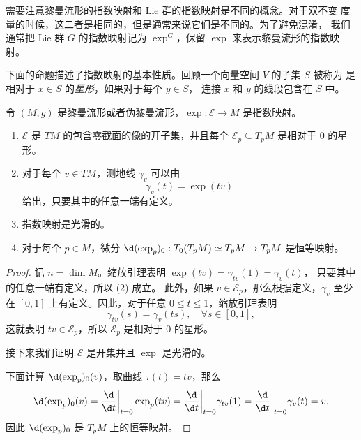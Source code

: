 需要注意黎曼流形的指数映射和 Lie 群的指数映射是不同的概念。对于双不变
度量的时候，这二者是相同的，但是通常来说它们是不同的。为了避免混淆，
我们通常把 Lie 群 $G$ 的指数映射记为 $\exp^G$，保留 $\exp$ 来表示黎曼流形的指数映射。

下面的命题描述了指数映射的基本性质。回顾一个向量空间 $V$ 的子集 $S$ 被称为
是相对于 $x\in S$ 的\emph{星形}，如果对于每个 $y\in S$，
连接 $x$ 和 $y$ 的线段包含在 $S$ 中。

\begin{proposition}[指数映射的性质]
  令 $(M,g)$ 是黎曼流形或者伪黎曼流形，$\exp:\mathcal{E}\to M$ 是指数映射。
  \begin{enumerate}
    \item $\mathcal{E}$ 是 $TM$ 的包含零截面的像的开子集，并且每个 $\mathcal{E}_p\subseteq T_pM$
    是相对于 $0$ 的星形。
    \item 对于每个 $v\in TM$，测地线 $\gamma_v$ 可以由
    \begin{equation}
      \gamma_v(t)=\exp(tv)
    \end{equation}
    给出，只要其中的任意一端有定义。
    \item 指数映射是光滑的。
    \item 对于每个 $p\in M$，微分 $\d(\exp_p)_0:T_0(T_pM)\simeq T_pM\to T_pM$
    是恒等映射。
  \end{enumerate}
\end{proposition}
\begin{proof}
  记 $n=\dim M$。缩放引理表明 $\exp(tv)=\gamma_{tv}(1)=\gamma_v(t)$，
  只要其中的任意一端有定义，所以 (2) 成立。
  此外，如果 $v\in \mathcal{E}_p$，那么根据定义，$\gamma_v$ 至少在 $[0,1]$
  上有定义。因此，对于任意 $0\leq t\leq 1$，缩放引理表明
  \[
    \gamma_{tv}(s)=\gamma_v(ts),\quad \forall s\in [0,1],
  \]
  这就表明 $tv\in \mathcal{E}_p$，所以 $\mathcal{E}_p$ 是相对于 $0$ 的星形。

  接下来我们证明 $\mathcal{E}$ 是开集并且 $\exp$ 是光滑的。

  下面计算 $\d (\exp_p)_0(v)$，取曲线 $\tau(t)=tv$，那么
  \[
    \d(\exp_p)_0(v)=\frac{\d}{\d t}\bigg|_{t=0}\exp_p(tv)
    =\frac{\d}{\d t}\bigg|_{t=0}\gamma_{tv}(1)
    =\frac{\d}{\d t}\bigg|_{t=0}\gamma_v(t)=v,
  \]
  因此 $\d(\exp_p)_0$ 是 $T_pM$ 上的恒等映射。
\end{proof}




